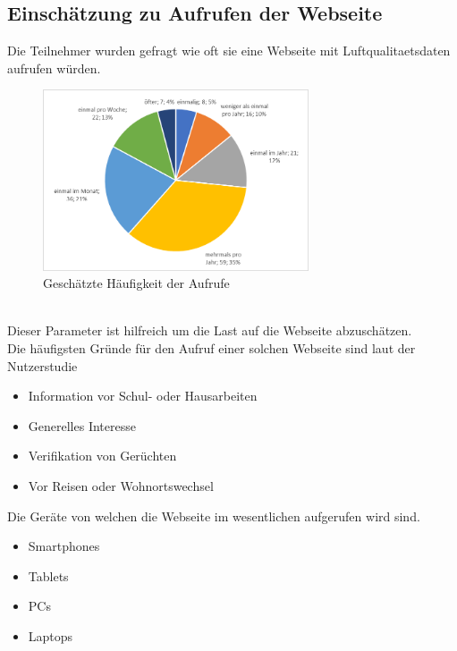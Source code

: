 \subsection{Einschätzung zu Aufrufen der Webseite}
Die Teilnehmer wurden gefragt wie oft sie eine Webseite mit \gls{Luftqualitaetsdaten} aufrufen würden.
\\
\begin{figure}[h]
    \centering
    \includegraphics[width=0.7\textwidth]{media/diagram/aufrufe.png}
    \caption{Geschätzte Häufigkeit der Aufrufe}
\end{figure}
\\
Dieser Parameter ist hilfreich um die Last auf die Webseite abzuschätzen.
\\
Die häufigsten Gründe für den Aufruf einer solchen Webseite sind laut der Nutzerstudie
\begin{itemize} [noitemsep]
    \item Information vor Schul- oder Hausarbeiten
    \item Generelles Interesse
    \item Verifikation von Gerüchten
    \item Vor Reisen oder Wohnortswechsel
\end{itemize}
Die Geräte von welchen die Webseite im wesentlichen aufgerufen wird sind.
\begin{itemize} [noitemsep]
    \item Smartphones
    \item Tablets
    \item PCs
    \item Laptops
\end{itemize}

